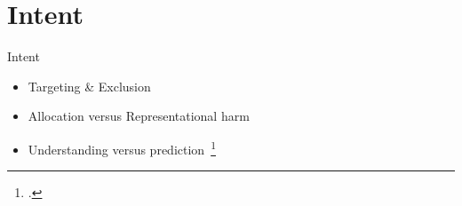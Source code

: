 \documentclass[main]{subfiles}
\begin{document}
\section{Intent}

\begin{frame}{Intent}
    \begin{itemize}
      \item Targeting \& Exclusion
      \item Allocation versus Representational harm
      \item Understanding versus prediction~\footcite{birhane2019algorithmic}
    \end{itemize}


\end{frame}
\end{document}
